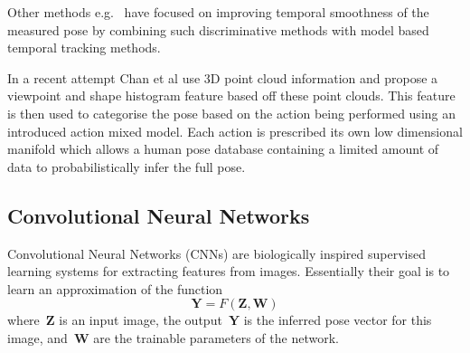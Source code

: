 \documentclass[11pt]{article} %
\begin{document}
Other methods e.g.~\cite{Ye2011,Wei2011,Baak2011,Zhu2008} have focused on improving temporal smoothness of the measured pose by combining such discriminative methods with model based temporal tracking methods. 

In a recent attempt Chan et al \cite{Chan2014} use 3D point cloud information and propose a viewpoint and shape histogram feature based off these point clouds. This feature is then used to categorise the pose based on the action being performed using an introduced action mixed model. Each action is prescribed its own low dimensional manifold which allows a human pose database containing a limited amount of data to probabilistically infer the full pose.




\subsection{Convolutional Neural Networks}

Convolutional Neural Networks (CNNs) are biologically inspired supervised learning systems for extracting features from images. Essentially their goal is to learn an approximation of the function
\begin{equation}
\boldsymbol{Y} = F(\boldsymbol{Z},\boldsymbol{W})
\label{eq:networkF}
\end{equation}
where~$\boldsymbol{Z}$ is an input image, the output~$\boldsymbol{Y}$ is the inferred pose vector for this image, and~$\boldsymbol{W}$ are the trainable parameters of the network. 
 
\end{document}

